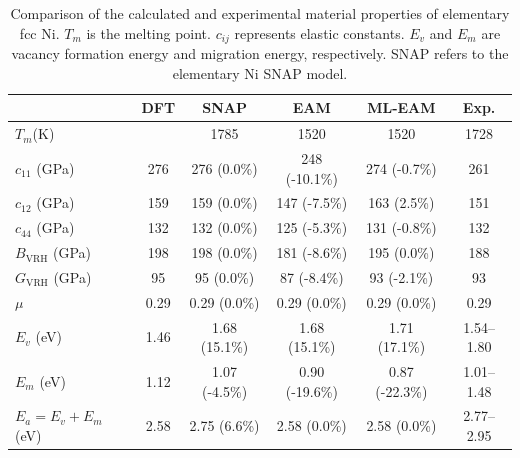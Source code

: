 \documentclass[prb,reprint]{revtex4-2}
\begin{document}
% 
%
\begin{table}
\centering
\begin{tabular}{lccccc}
\hline
                              & DFT  & SNAP \cite{SNAP} & EAM              & ML-EAM         & Exp.                           \\
\hline
$T_{m}$(K)                    &      & 1785             & 1520 \cite{ZJW2} & 1520           & 1728                           \\
$c_{11}$ (GPa)                & 276  & 276 (0.0\%)      & 248 (-10.1\%)    & 274 (-0.7\%)   & 261 \cite{Ni_Elastic_Exp}      \\
$c_{12}$ (GPa)                & 159  & 159 (0.0\%)      & 147 (-7.5\%)     & 163 (2.5\%)    & 151 \cite{Ni_Elastic_Exp}      \\
$c_{44}$ (GPa)                & 132  & 132 (0.0\%)      & 125 (-5.3\%)     & 131 (-0.8\%)   & 132 \cite{Ni_Elastic_Exp}      \\
$B_{\mathrm{VRH}}$ (GPa)      & 198  & 198 (0.0\%)      & 181 (-8.6\%)     & 195 (0.0\%)    & 188                            \\
$G_{\mathrm{VRH}}$ (GPa)      & 95   & 95 (0.0\%)       & 87 (-8.4\%)      & 93 (-2.1\%)    & 93                             \\
$\mu$                         & 0.29 & 0.29 (0.0\%)     & 0.29 (0.0\%)     & 0.29 (0.0\%)   & 0.29                           \\
$E_{v}$ (eV)                  & 1.46 & 1.68 (15.1\%)    & 1.68 (15.1\%)    & 1.71 (17.1\%)  & 1.54–1.80 \cite{Ni_EvEmEa_Exp} \\
$E_{m}$ (eV)                  & 1.12 & 1.07 (-4.5\%)    & 0.90 (-19.6\%)   & 0.87 (-22.3\%) & 1.01–1.48 \cite{Ni_EvEmEa_Exp} \\
$E_{a} = E_{v} + E_{m} $ (eV) & 2.58 & 2.75 (6.6\%)     & 2.58 (0.0\%)     & 2.58 (0.0\%)   & 2.77–2.95 \cite{Ni_EvEmEa_Exp} \\
\hline
\end{tabular}
\caption{\label{table:Ni_properties} Comparison of the calculated and 
experimental material properties of elementary fcc Ni. $T_{m}$ is the melting 
point. $c_{ij}$ represents elastic constants. $E_{v}$ and $E_{m}$ are vacancy 
formation energy and migration energy, respectively. SNAP refers to the 
elementary Ni SNAP model.
}
\end{table}
\end{document}
